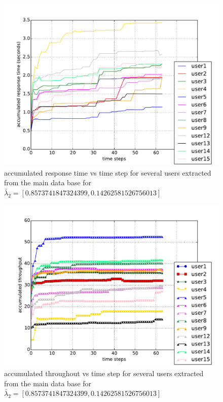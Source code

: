 \documentclass[10pt,journal,compsoc]{IEEEtran}
\begin{document}
\begin{figure}[h] %
\includegraphics[width=\linewidth]{graphs/rt_step_lambda2}
\caption{ accumulated response time vs time step for several users extracted from the main data base for  $\bar{\lambda}_2 = [0.8573741847324399, 0.14262581526756013]$}
\end{figure}

\begin{figure}[h]
\includegraphics[width=\linewidth]{graphs/trough_step_lambda2}
\caption{accumulated throughout vs time step for several users extracted from the main data base for $\bar{\lambda}_2 = [0.8573741847324399, 0.14262581526756013]$}
\end{figure}
\end{document}
